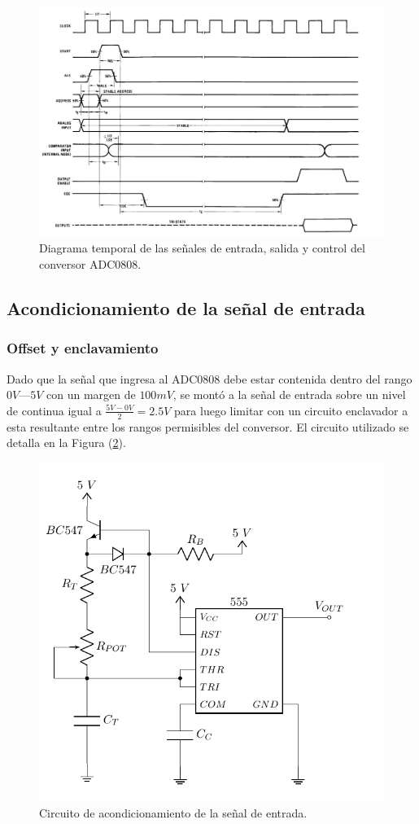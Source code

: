 \begin{figure}[H]
\centering
\includegraphics[width=0.9\linewidth]{ImagenesEjercicio1/ADC_TIMING.png}
\caption{Diagrama temporal de las señales de entrada, salida y control del conversor ADC0808.}
\label{ADC_TIMING}
\end{figure}

\subsection{Acondicionamiento de la señal de entrada}

\subsubsection{Offset y enclavamiento}

Dado que la señal que ingresa al ADC0808 debe estar contenida dentro del rango $0V$—$5V$ con un margen de $100mV$, se montó a la señal de entrada sobre un nivel de continua igual a $\frac{5V - 0V}{2} = 2.5V$ para luego limitar con un circuito enclavador a esta resultante entre los rangos permisibles del conversor. El circuito utilizado se detalla en la Figura (\ref{ACOND}).

\begin{figure}[H]
\centering
\includegraphics[width=0.7\linewidth, page = 3]{ImagenesEjercicio1/Components.pdf}
\caption{Circuito de acondicionamiento de la señal de entrada.}
\label{ACOND}
\end{figure}

